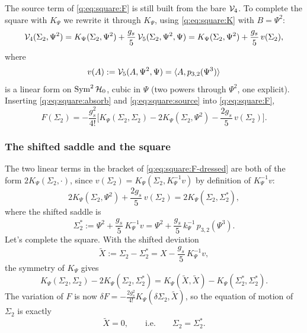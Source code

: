 The source term of \eqref{q:eq:square:F} is still built from the bare ${\mathcal{V}}_4$.
To complete the square with $K_\Psi$ we rewrite it through $K_\Psi$, using \eqref{q:eq:square:K} with $B=\Psi^2$:
\begin{equation}
  \label{q:eq:square:source}
  {\mathcal{V}}_4(\Sigma_2, \Psi^2)
    = K_\Psi(\Sigma_2, \Psi^2) + \frac{g_s}{5} \, {\mathcal{V}}_5(\Sigma_2, \Psi^2, \Psi)
    = K_\Psi(\Sigma_2, \Psi^2) + \frac{g_s}{5} \, v(\Sigma_2),
\end{equation}
where
\begin{equation}
  \label{q:eq:square:v}
  v(A)
    := {\mathcal{V}}_5(A, \Psi^2, \Psi)
    = \braket{A, p_{3,2}(\Psi^3)}
\end{equation}
is a linear form on $\operatorname{Sym}^2{\mathcal{H}}_0$, cubic in $\Psi$ (two powers through $\Psi^2$, one explicit).
Inserting \eqref{q:eq:square:absorb} and \eqref{q:eq:square:source} into \eqref{q:eq:square:F},
\begin{equation}
  \label{q:eq:square:F-dressed}
  F(\Sigma_2)
    = - \frac{g_s^2}{4!} \Big[
        K_\Psi(\Sigma_2, \Sigma_2)
        - 2 K_\Psi(\Sigma_2, \Psi^2)
        - \frac{2 g_s}{5} \, v(\Sigma_2)
      \Big].
\end{equation}

\subsubsection{The shifted saddle and the square}
\label{q:sec:square:saddle}

The two linear terms in the bracket of \eqref{q:eq:square:F-dressed} are both of the form $2K_\Psi(\Sigma_2,\cdot)$, since $v(\Sigma_2)=K_\Psi(\Sigma_2,K_\Psi^{-1}v)$ by definition of $K_\Psi^{-1}v$:
\begin{equation}
  2 K_\Psi(\Sigma_2, \Psi^2) + \frac{2 g_s}{5} \, v(\Sigma_2)
    = 2 K_\Psi(\Sigma_2, \Sigma_2^*),
\end{equation}
where the shifted saddle is
\begin{equation}
  \label{q:eq:square:saddle}
  \boxed{\;
  \Sigma_2^*
    := \Psi^2 + \frac{g_s}{5} \, K_\Psi^{-1} v
    = \Psi^2 + \frac{g_s}{5} \, k_\Psi^{-1} \, p_{3,2}(\Psi^3).
  \;}
\end{equation}
Let's complete the square.
With the shifted deviation
\begin{equation}
  \label{q:eq:square:Xtilde}
  \tilde X
    := \Sigma_2 - \Sigma_2^*
    = X - \frac{g_s}{5} \, K_\Psi^{-1} v,
\end{equation}
the symmetry of $K_\Psi$ gives
\begin{equation}
  \label{q:eq:square:square}
  K_\Psi(\Sigma_2, \Sigma_2) - 2 K_\Psi(\Sigma_2, \Sigma_2^*)
    = K_\Psi(\tilde X, \tilde X) - K_\Psi(\Sigma_2^*, \Sigma_2^*).
\end{equation}
The variation of $F$ is now $\delta F=-\frac{2g_s^2}{4!}K_\Psi(\delta\Sigma_2,\tilde X)$, so the equation of motion of $\Sigma_2$ is exactly
\begin{equation}
  \tilde X = 0,
  \qquad\text{i.e.}\qquad
  \Sigma_2 = \Sigma_2^* .
\end{equation}

